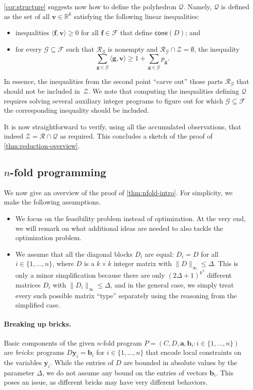 \documentclass{theoretics}
\renewcommand{\leq}{\leqslant}
\renewcommand{\geq}{\geqslant}
\newcommand{\R}{\mathbb{R}}
\newcommand{\tup}[1]{{\mathbf{#1}}}
\newcommand{\yy}{\tup y}
\newcommand{\av}{\tup a}
\newcommand{\bb}{\tup b}
\newcommand{\ff}{\tup f}
\renewcommand{\gg}{\tup g}
\newcommand{\myvv}{\tup v} %
\newcommand{\Qq}{\mathcal{Q}}
\newcommand{\Ff}{\mathcal{F}}
\newcommand{\Gg}{\mathcal{G}}
\newcommand{\Rr}{\mathcal{R}}
\newcommand{\Zz}{\mathcal{Z}}
\newcommand{\sca}[2]{\langle #1,#2\rangle}
\newcommand{\nfold}{$n$-fold}
\newcommand{\realcone}{\mathsf{cone}}
\begin{document}
\cref{cor:structure} suggests now how to define the polyhedron $\Qq$. Namely, $\Qq$ is defined as the set of all $\myvv\in \R^k$ satisfying the following linear inequalities:
\begin{itemize}[nosep]
\item inequalities $\sca{\ff}{\myvv}\geq 0$ for all $\ff\in \Ff$ that define $\realcone(D)$; and
\item for every $\Gg\subseteq \Ff$ such that $\Rr_\Gg$ is nonempty and $\Rr_\Gg\cap \Zz=\emptyset$, the inequality
$$\sum_{\gg\in \Gg} \sca{\gg}{\myvv}\geq 1+\sum_{\gg\in \Gg} p_{\gg}.$$
\end{itemize}
In essence, the inequalities from the second point ``carve out'' those parts $\Rr_\Gg$ that should not be included in~$\Zz$. We note that computing the inequalities defining $\Qq$ requires solving several auxiliary integer programs to figure out for which $\Gg\subseteq \Ff$ the corresponding inequality should be included.

It is now straightforward to verify, using all the accumulated observations, that indeed $\Zz=\Rr\cap \Qq$ as required. This concludes a sketch of the proof of \cref{thm:reduction-overview}.

\subsection{\texorpdfstring{\nfold{}}{n-fold} programming}

We now give an overview of the proof of \cref{thm:nfold-intro}. For simplicity, we make the following assumptions.
\begin{itemize}[nosep]
\item We focus on the feasibility problem instead of optimization. At the very end, we will remark on what additional ideas are needed to also tackle the optimization problem.
\item We assume that all the diagonal blocks $D_i$ are equal: $D_i=D$ for all $i\in \{1,\ldots,n\}$, where $D$ is a $k\times k$ integer matrix with $\|D\|_\infty\leq \Delta$. This is only a minor simplification because there are only $(2\Delta+1)^{k^2}$ different matrices $D_i$ with $\|D_i\|_\infty\leq \Delta$, and in the general case, we simply treat every such possible matrix ``type'' separately using the reasoning from the simplified case.
\end{itemize}

\paragraph*{Breaking up bricks.} Basic components of the given $n$-fold program $P=(C,D,\av,\bb_i\colon i\in \{1,\ldots,n\})$ are {\em{bricks}}: programs $D\yy_i=\bb_i$ for $i\in \{1,\ldots,n\}$ that encode local constraints on the variables $\yy_i$. While the entries of $D$ are bounded in absolute values by the parameter $\Delta$, we do not assume any bound on the entries of vectors $\bb_i$. This poses an issue, as different bricks may have very different behaviors.
\end{document}
